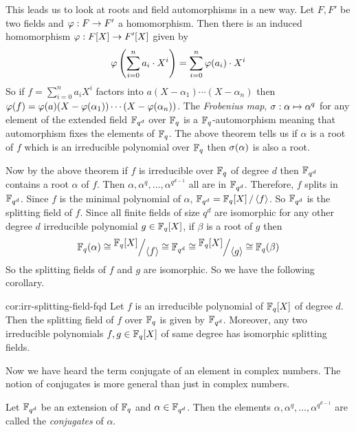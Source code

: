 This leads us to look at roots and field automorphisms in a new way. Let $F,F'$ be two fields and $\varphi:F\to F'$ a homomorphism.
Then there is an induced homomorphism $\varphi:F[X]\to F'[X]$ given by $$\varphi\left(\sum_{i=0}^na_i\cdot X^i\right)=\sum_{i=0}^n \varphi(a_i)\cdot X^i$$
So if $f=\sum_{i=0}^na_iX^i$ factors into $a(X-\alpha_1)\cdots (X-\alpha_n)$ then $\varphi(f)=\varphi(a)(X-\varphi(\alpha_1))\cdots (X-\varphi(\alpha_n))$. The \emph{Frobenius map},  $\sigma:\alpha\mapsto \alpha^q$ for any element of the extended field $\mathbb{F}_{q^d}$ over $\mathbb{F}_q$ is a $\mathbb{F}_q$-automorphism meaning that automorphism fixes the elements of $\mathbb{F}_q$. The above theorem tells us if $\alpha$ is a root of $f$ which is an irreducible polynomial over $\mathbb{F}_q$ then $\sigma(\alpha)$ is also a root.

Now by the above theorem if $f$ is irreducible over $\mathbb{F}_q$ of degree $d$ then $\mathbb{F}_{q^d}$ contains a root $\alpha$ of $f$. Then $\alpha,\alpha^q,\dots, \alpha^{q^{d-1}}$ all are in $\mathbb{F}_{q^d}$. Therefore, $f$ splits in $\mathbb{F}_{q^d}$. Since $f$ is the minimal polynomial of $\alpha$, $\bbF_{q^d}=\quotient{\bbF_q[X]}{\la f\ra}$. So $\mathbb{F}_{q^d}$ is the splitting field of $f$. Since all finite fields of size $q^d$ are isomorphic for any other degree $d$ irreducible polynomial $g\in\mathbb{F}_q[X]$, if $\beta$ is a root of $g$ then $$\bbF_q(\alpha)\cong \quotient{\bbF_q[X]}{\la f\ra}\cong\bbF_{q^d}\cong \quotient{\bbF_q[X]}{\la g\ra}\cong\bbF_q(\beta)$$So the splitting fields of $f$ and $g$ are isomorphic. So we have the following corollary.

\begin{corolary}{}{cor:irr-splitting-field-fqd}
  Let $f$ is an irreducible polynomial of $\mathbb{F}_q[X]$ of degree $d$. Then the splitting field of $f$ over $\mathbb{F}_q$ is given by $\mathbb{F}_{q^d}$. Moreover, any two irreducible polynomials $f,g\in\mathbb{F}_q[X]$ of same degree has isomorphic splitting fields.
\end{corolary}

Now we have heard the term conjugate of an element in complex numbers. The notion of conjugates is more general than just in complex numbers. 
\begin{Definition}{}{}
  Let $\mathbb{F}_{q^d}$ be an extension of $\mathbb{F}_q$ and $\alpha\in\mathbb{F}_{q^d}$. Then the elements $\alpha,\alpha^q,\dots, \alpha^{q^{d-1}}$ are called the \emph{conjugates} of $\alpha$. 
\end{Definition}

